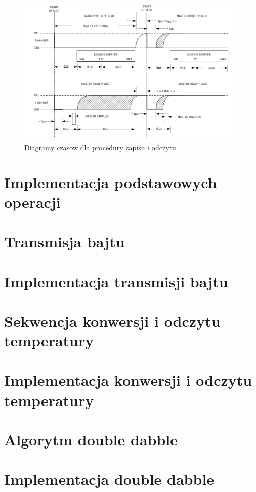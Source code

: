 \documentclass[a4paper]{article}
\begin{document}
\begin{figure}[!h]
\begin{center}
\includegraphics[scale=0.5]{graphics/slots.png}
\end{center}
\label{slotsitming}
\caption{Diagramy czasow dla procedury zapisu i odczytu}
\end{figure}

\section{Implementacja podstawowych operacji}
\section{Transmisja bajtu}
\section{Implementacja transmisji bajtu}
\section{Sekwencja konwersji i odczytu temperatury}
\section{Implementacja konwersji i odczytu temperatury}
\section{Algorytm double dabble}
\section{Implementacja double dabble}
\end{document}

